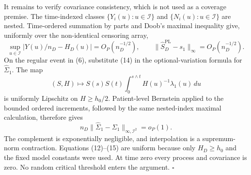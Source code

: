 It remains to verify covariance consistency, which is not used as a coverage premise. The time-indexed classes \(\{Y_i(u):u\in\mathcal I\}\) and \(\{N_i(u):u\in\mathcal I\}\) are nested. Time-ordered summation by parts and Doob's maximal inequality give, uniformly over the non-identical censoring array,
\[
 \sup_{u\in\mathcal I}|Y(u)/n_D-H_D(u)|=O_P(n_D^{-1/2}),
 \qquad
 \|\widehat S_D^{\mathrm{PL}}-s_1\|_\infty=O_P(n_D^{-1/2}). \tag{14}
\]
On the regular event in (6), substitute (14) in the optional-variation formula for \(\widehat\Sigma_1\). The map
\[
 (S,H)\longmapsto S(s)S(t)
 \int_0^{s\wedge t}H(u)^{-1}\lambda_1(u)\,du
\]
is uniformly Lipschitz on \(H\ge h_0/2\). Patient-level Bernstein applied to the bounded ordered increments, followed by the same nested-index maximal calculation, therefore gives
\[
 n_D\|\widehat\Sigma_1-\Sigma_1\|_{\infty,\mathcal I^2}
 =o_P(1).                                                  \tag{15}
\]
The complement is exponentially negligible, and interpolation is a supremum-norm contraction. Equations (12)--(15) are uniform because only \(H_D\ge h_0\) and the fixed model constants were used. At time zero every process and covariance is zero. No random critical threshold enters the argument. \(\square\)